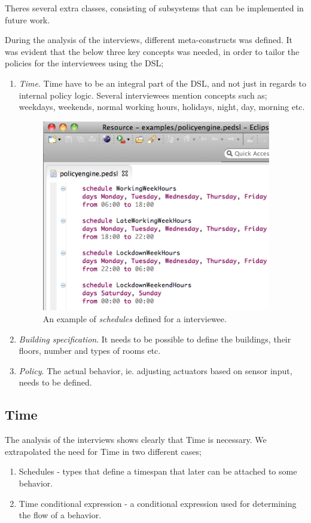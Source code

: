 \documentclass{llncs}
\begin{document}
Theres several extra classes, consisting of subsystems that can be implemented in future work.

During the analysis of the interviews, different meta-constructs was defined. It was evident that the below three key concepts was needed, in order to tailor the policies for the interviewees using the DSL;

\begin{enumerate}
	\item \textit{Time}. Time have to be an integral part of the DSL, and not just in regards to internal policy logic. Several interviewees mention concepts such as; weekdays, weekends, normal working hours, holidays, night, day, morning etc.
	
\begin{figure}
  \begin{center}
    \includegraphics[width=10cm]{dsl-schedules.png}
  \end{center}  
\caption{An example of \textit{schedules} defined for a interviewee.}
\label{fig:dsæ-schedules}
\end{figure}
	
	\item \textit{Building specification}. It needs to be possible to define the buildings, their floors, number and types of rooms etc.

	\item \textit{Policy}. The actual behavior, ie. adjusting actuators based on sensor input, needs to be defined. 
\end{enumerate}

\subsection{Time}\label{subsec:time}
The analysis of the interviews shows clearly that Time is necessary. We extrapolated the need for Time in two different cases;
	\begin{enumerate}
		\item Schedules - types that define a timespan that later can be attached to some behavior.
		\item Time conditional expression - a conditional expression used for determining the flow of a behavior.
	\end{enumerate}
\end{document}
